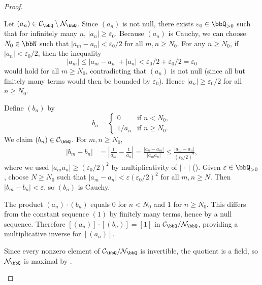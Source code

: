 \begin{proof}
\begin{enumerate}
        Let $(a_n) \in \mathcal{C}_\bbQ \setminus \mathcal{N}_\bbQ$. Since $(a_n)$ is not null, there exists $\varepsilon_0 \in \bbQ_{>0}$ such that for infinitely many $n$, $|a_n| \ge \varepsilon_0$. Because $(a_n)$ is Cauchy, we can choose $N_0 \in \bbN$ such that $|a_m - a_n| < \varepsilon_0/2$ for all $m, n \ge N_0$. For any $n \ge N_0$, if $|a_n| < \varepsilon_0/2$, then the inequality
        $$|a_m| \le |a_m - a_n| + |a_n| < \varepsilon_0/2 + \varepsilon_0/2 = \varepsilon_0$$
        would hold for all $m \ge N_0$, contradicting that $(a_n)$ is not null (since all but finitely many terms would then be bounded by $\varepsilon_0$). Hence $|a_n| \ge \varepsilon_0/2$ for all $n \ge N_0$.

        Define $(b_n)$ by
        $$b_n = \begin{cases} 0 & \text{if } n < N_0, \\ 1/a_n & \text{if } n \ge N_0. \end{cases}$$
        We claim $(b_n) \in \mathcal{C}_\bbQ$. For $m, n \ge N_0$,
        \begin{align*}
            |b_m - b_n|
            &= \left|\frac{1}{a_m} - \frac{1}{a_n}\right|
            = \frac{|a_n - a_m|}{|a_m a_n|}
            \le \frac{|a_m - a_n|}{(\varepsilon_0/2)^2},
        \end{align*}
        where we used $|a_m a_n| \ge (\varepsilon_0/2)^2$ by multiplicativity of $|\,\cdot\,|$ (). Given $\varepsilon \in \bbQ_{>0}$, choose $N \ge N_0$ such that $|a_m - a_n| < \varepsilon (\varepsilon_0/2)^2$ for all $m, n \ge N$. Then $|b_m - b_n| < \varepsilon$, so $(b_n)$ is Cauchy.

        The product $(a_n) \cdot (b_n)$ equals $0$ for $n < N_0$ and $1$ for $n \ge N_0$. This differs from the constant sequence $(1)$ by finitely many terms, hence by a null sequence. Therefore $[(a_n)] \cdot [(b_n)] = [1]$ in $\mathcal{C}_\bbQ / \mathcal{N}_\bbQ$, providing a multiplicative inverse for $[(a_n)]$.

        Since every nonzero element of $\mathcal{C}_\bbQ / \mathcal{N}_\bbQ$ is invertible, the quotient is a field, so $\mathcal{N}_\bbQ$ is maximal by .
    \end{enumerate}
\end{proof}